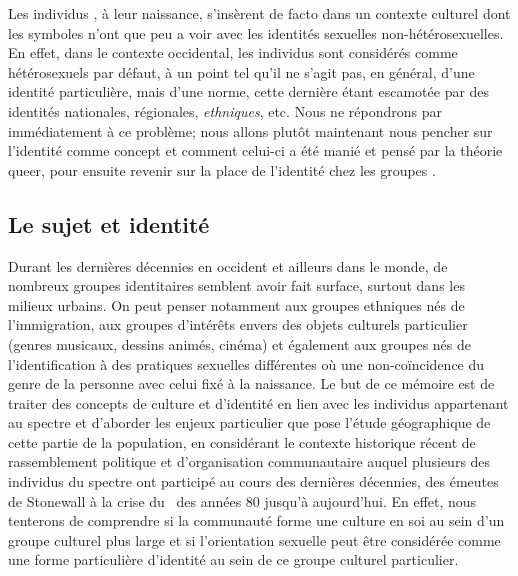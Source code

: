 Les individus \lgbt{}, à leur naissance, s'insèrent de facto dans un contexte culturel dont les symboles n'ont que peu a voir avec les identités sexuelles non-hétérosexuelles. 
En effet, dans le contexte occidental, les individus sont considérés comme hétérosexuels par défaut, à un point tel qu'il ne s'agit pas, en général, d'une identité particulière, mais d'une norme, cette dernière étant escamotée par des identités nationales, régionales, \emph{ethniques}, etc.
Nous ne répondrons par immédiatement à ce problème; nous allons plutôt maintenant nous pencher sur l'identité comme concept et comment celui-ci a été manié et pensé par la théorie queer, pour ensuite revenir sur la place de l'identité chez les groupes \lgbt{}.

\subsection{Le sujet et identité}
\label{subsec:sujet_et_identité} Durant les dernières décennies en occident et ailleurs dans le monde, de nombreux groupes identitaires semblent avoir fait surface, surtout dans les milieux urbains. 
On peut penser notamment aux groupes ethniques nés de l'immigration, aux groupes d'intérêts envers des objets culturels particulier (genres musicaux, dessins animés, cinéma) et également aux groupes nés de l'identification à des pratiques sexuelles différentes où une non-coïncidence du genre de la personne avec celui fixé à la naissance. 
Le but de ce mémoire est de traiter des concepts de culture et d'identité en lien avec les individus appartenant au spectre \lgbt{} et d'aborder les enjeux particulier que pose l'étude géographique de cette partie de la population, en considérant le contexte historique récent de rassemblement politique et d'organisation communautaire auquel plusieurs des individus du spectre \lgbt{} ont participé au cours des dernières décennies, des émeutes de Stonewall à la crise du \sida\ des années 80 jusqu'à aujourd'hui. 
En effet, nous tenterons de comprendre si la communauté \lgbt{} forme une culture en soi au sein d'un groupe culturel plus large et si l'orientation sexuelle peut être considérée comme une forme particulière d'identité au sein de ce groupe culturel particulier. 

